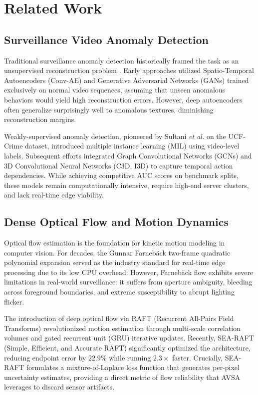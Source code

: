 \documentclass[conference]{IEEEtran}
\begin{document}
\section{Related Work}

\subsection{Surveillance Video Anomaly Detection}
Traditional surveillance anomaly detection historically framed the task as an unsupervised reconstruction problem \cite{sultani2018real}. Early approaches utilized Spatio-Temporal Autoencoders (Conv-AE) and Generative Adversarial Networks (GANs) trained exclusively on normal video sequences, assuming that unseen anomalous behaviors would yield high reconstruction errors. However, deep autoencoders often generalize surprisingly well to anomalous textures, diminishing reconstruction margins.

Weakly-supervised anomaly detection, pioneered by Sultani \textit{et al.} \cite{sultani2018real} on the UCF-Crime dataset, introduced multiple instance learning (MIL) using video-level labels. Subsequent efforts integrated Graph Convolutional Networks (GCNs) and 3D Convolutional Neural Networks (C3D, I3D) to capture temporal action dependencies. While achieving competitive AUC scores on benchmark splits, these models remain computationally intensive, require high-end server clusters, and lack real-time edge viability.

\subsection{Dense Optical Flow and Motion Dynamics}
Optical flow estimation is the foundation for kinetic motion modeling in computer vision. For decades, the Gunnar Farneb\"ack two-frame quadratic polynomial expansion \cite{farneback2003two} served as the industry standard for real-time edge processing due to its low CPU overhead. However, Farneb\"ack flow exhibits severe limitations in real-world surveillance: it suffers from aperture ambiguity, bleeding across foreground boundaries, and extreme susceptibility to abrupt lighting flicker.

The introduction of deep optical flow via RAFT (Recurrent All-Pairs Field Transforms) \cite{teed2020raft} revolutionized motion estimation through multi-scale correlation volumes and gated recurrent unit (GRU) iterative updates. Recently, SEA-RAFT (Simple, Efficient, and Accurate RAFT) \cite{wang2024searaft} significantly optimized the architecture, reducing endpoint error by $22.9\%$ while running $2.3\times$ faster. Crucially, SEA-RAFT formulates a mixture-of-Laplace loss function that generates per-pixel uncertainty estimates, providing a direct metric of flow reliability that AVSA leverages to discard sensor artifacts.
\end{document}
